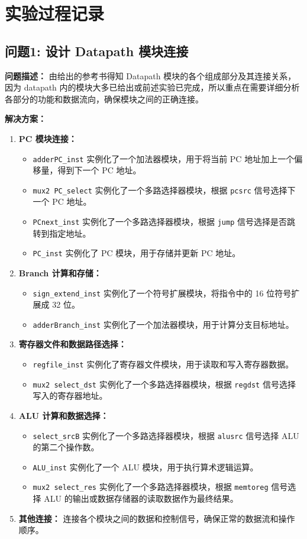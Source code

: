 \section{实验过程记录}

\subsection{问题1: 设计 Datapath 模块连接}
\textbf{问题描述：} 由给出的参考书得知 Datapath 模块的各个组成部分及其连接关系，因为 datapath 内的模块大多已给出或前述实验已完成，所以重点在需要详细分析各部分的功能和数据流向，确保模块之间的正确连接。

\textbf{解决方案：}
\begin{enumerate}
    \item \textbf{PC 模块连接：}
    \begin{itemize}
        \item \texttt{adderPC\_inst} 实例化了一个加法器模块，用于将当前 PC 地址加上一个偏移量，得到下一个 PC 地址。
        \item \texttt{mux2 PC\_select} 实例化了一个多路选择器模块，根据 \texttt{pcsrc} 信号选择下一个 PC 地址。
        \item \texttt{PCnext\_inst} 实例化了一个多路选择器模块，根据 \texttt{jump} 信号选择是否跳转到指定地址。
        \item \texttt{PC\_inst} 实例化了 PC 模块，用于存储并更新 PC 地址。
    \end{itemize}
    \item \textbf{Branch 计算和存储：}
    \begin{itemize}
        \item \texttt{sign\_extend\_inst} 实例化了一个符号扩展模块，将指令中的 16 位符号扩展成 32 位。
        \item \texttt{adderBranch\_inst} 实例化了一个加法器模块，用于计算分支目标地址。
    \end{itemize}
    \item \textbf{寄存器文件和数据路径选择：}
    \begin{itemize}
        \item \texttt{regfile\_inst} 实例化了寄存器文件模块，用于读取和写入寄存器数据。
        \item \texttt{mux2 select\_dst} 实例化了一个多路选择器模块，根据 \texttt{regdst} 信号选择写入的寄存器地址。
    \end{itemize}
    \item \textbf{ALU 计算和数据选择：}
    \begin{itemize}
        \item \texttt{select\_srcB} 实例化了一个多路选择器模块，根据 \texttt{alusrc} 信号选择 ALU 的第二个操作数。
        \item \texttt{ALU\_inst} 实例化了一个 ALU 模块，用于执行算术逻辑运算。
        \item \texttt{mux2 select\_res} 实例化了一个多路选择器模块，根据 \texttt{memtoreg} 信号选择 ALU 的输出或数据存储器的读取数据作为最终结果。
    \end{itemize}
    \item \textbf{其他连接：} 连接各个模块之间的数据和控制信号，确保正常的数据流和操作顺序。
\end{enumerate}

